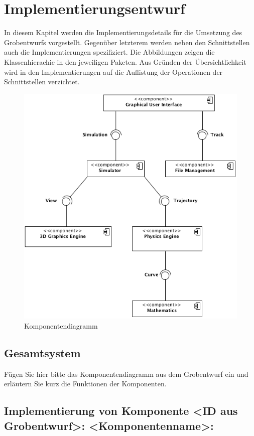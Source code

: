 \chapter{Implementierungsentwurf}

In diesem Kapitel werden die Implementierungsdetails für die Umsetzung des
Grobentwurfs vorgestellt. Gegenüber letzterem werden neben den Schnittstellen
auch die Implementierungen spezifiziert. Die Abbildungen zeigen die 
Klassenhierachie in den jeweiligen Paketen. Aus Gründen der Übersichtlichkeit
wird in den Implementierungen auf die Auflistung der Operationen der Schnittstellen
verzichtet.

\begin{figure}[!h]
	\includegraphics[width=0.8\linewidth]{bilder/components.png}
\caption{Komponentendiagramm}
\end{figure}


\section{Gesamtsystem}
Fügen Sie hier bitte das Komponentendiagramm aus dem Grobentwurf ein und
erläutern Sie kurz die Funktionen der Komponenten.
\section{Implementierung von Komponente
         <ID aus Grobentwurf>: <Komponentenname>:}

